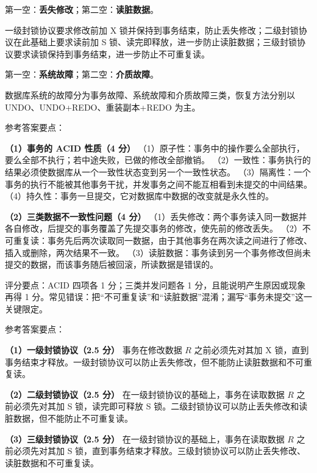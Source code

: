\documentclass[a4paper,11pt]{article}
\begin{document}
\q 第一空：\textbf{丢失修改}；第二空：\textbf{读脏数据}。\begin{analysis}一级封锁协议要求修改前加 X 锁并保持到事务结束，防止丢失修改；二级封锁协议在此基础上要求读前加 S 锁、读完即释放，进一步防止读脏数据；三级封锁协议要求读锁保持到事务结束，进一步防止不可重复读。\end{analysis}

\q 第一空：\textbf{系统故障}；第二空：\textbf{介质故障}。\begin{analysis}数据库系统的故障分为事务故障、系统故障和介质故障三类，恢复方法分别以 UNDO、UNDO+REDO、重装副本+REDO 为主。\end{analysis}


\q 参考答案要点：

\textbf{（1）事务的 ACID 性质（4 分）}
（1）原子性：事务中的操作要么全部执行，要么全部不执行；若中途失败，已做的修改全部撤销。
（2）一致性：事务执行的结果必须使数据库从一个一致性状态变到另一个一致性状态。
（3）隔离性：一个事务的执行不能被其他事务干扰，并发事务之间不能互相看到未提交的中间结果。
（4）持久性：事务一旦提交，它对数据库中数据的改变就是永久性的。

\textbf{（2）三类数据不一致性问题（4 分）}
（1）丢失修改：两个事务读入同一数据并各自修改，后提交的事务覆盖了先提交事务的修改，使先前的修改丢失。
（2）不可重复读：事务先后两次读取同一数据，由于其他事务在两次读之间进行了修改、插入或删除，两次结果不一致。
（3）读脏数据：事务读到另一个事务修改但尚未提交的数据，而该事务随后被回滚，所读数据是错误的。
\begin{analysis}评分要点：ACID 四项各 1 分；三类并发问题各 1 分，且能说明产生原因或现象再得 1 分。常见错误：把“不可重复读”和“读脏数据”混淆；漏写“事务未提交”这一关键限定。\end{analysis}

\q 参考答案要点：

\textbf{（1）一级封锁协议（2.5 分）}
事务在修改数据 $R$ 之前必须先对其加 X 锁，直到事务结束才释放。一级封锁协议可以防止丢失修改，但不能防止读脏数据和不可重复读。

\textbf{（2）二级封锁协议（2.5 分）}
在一级封锁协议的基础上，事务在读取数据 $R$ 之前必须先对其加 S 锁，读完即可释放 S 锁。二级封锁协议可以防止丢失修改和读脏数据，但不能防止不可重复读。

\textbf{（3）三级封锁协议（2.5 分）}
在一级封锁协议的基础上，事务在读取数据 $R$ 之前必须先对其加 S 锁，直到事务结束才释放。三级封锁协议可以防止丢失修改、读脏数据和不可重复读。
\end{document}
